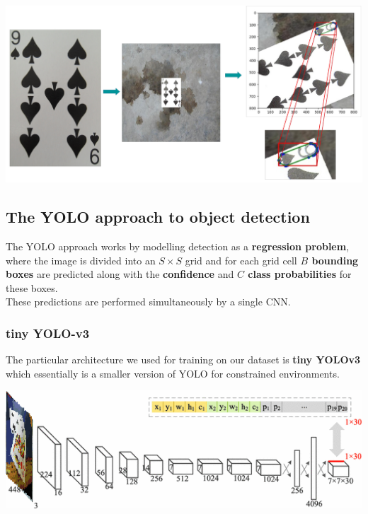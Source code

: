 \documentclass[a0,landscape]{a0poster}
\begin{document}
\begin{multicols}{3}
\vspace{1cm}
\begin{minipage}[b]{0.27\textwidth}
\includegraphics[width=\textwidth]{7-p}
\end{minipage}

\subsection*{The YOLO approach to object detection}
The YOLO approach works by modelling detection as a \textbf{regression problem}, where the image is divided into an $S\times S$ grid and for each grid cell \textbf{$B$ bounding boxes} are predicted along with the \textbf{confidence} and \textbf{$C$ class probabilities} for these boxes. \\
These predictions are performed simultaneously by a single CNN.
\subsubsection*{tiny YOLO-v3}

The particular architecture we used for training on our dataset is \textbf{tiny YOLOv3} which essentially is a smaller version of YOLO for constrained environments.
\begin{center}\vspace{0cm}
\includegraphics[width=0.7\linewidth]{tinyyolo}
\end{center}\vspace{0cm}


\end{multicols}
\end{document}
